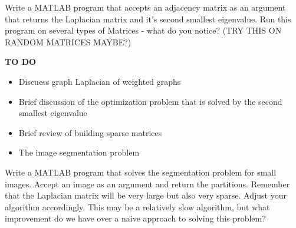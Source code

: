 \begin{problem}Write a MATLAB program that accepts an adjacency matrix as an argument that returns the Laplacian matrix and it's second smallest eigenvalue.  Run this program on several types of Matrices - what do you notice? (TRY THIS ON RANDOM MATRICES MAYBE?)
\end{problem}

{\bf TO DO}
\begin{itemize}
\item Discuess graph Laplacian of weighted graphs
\item Brief discussion of the optimization problem that is solved by the second smallest eigenvalue
\item Brief review of building sparse matrices
\item The image segmentation problem
\end{itemize}

\begin{problem}  Write a MATLAB program that solves the segmentation problem for small images.  Accept an image as an argument and return the partitions.  Remember that the Laplacian matrix will be very large but also very sparse.  Adjust your algorithm accordingly.  This may be a relatively slow algorithm, but what improvement do we have over a naive approach to solving this problem?
\end{problem}
